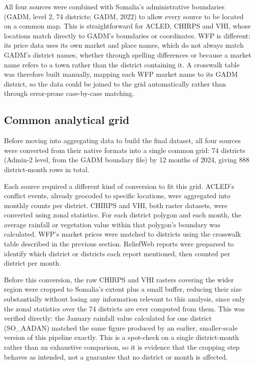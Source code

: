 \documentclass[12pt,a4paper]{article}
\begin{document}
All four sources were combined with Somalia's administrative boundaries (GADM, level 2, 74 districts; GADM, 2022) to allow every source to be located on a common map. This is straightforward for ACLED, CHIRPS and VHI, whose locations match directly to GADM's boundaries or coordinates. WFP is different: its price data uses its own market and place names, which do not always match GADM's district names, whether through spelling differences or because a market name refers to a town rather than the district containing it. A crosswalk table was therefore built manually, mapping each WFP market name to its GADM district, so the data could be joined to the grid automatically rather than through error-prone case-by-case matching.

\subsection{Common analytical grid}

Before moving into aggregating data to build the final dataset, all four sources were converted from their native formats into a single common grid: 74 districts (Admin-2 level, from the GADM boundary file) by 12 months of 2024, giving 888 district-month rows in total.

Each source required a different kind of conversion to fit this grid. ACLED's conflict events, already geocoded to specific locations, were aggregated into monthly counts per district. CHIRPS and VHI, both raster datasets, were converted using zonal statistics. For each district polygon and each month, the average rainfall or vegetation value within that polygon's boundary was calculated. WFP's market prices were matched to districts using the crosswalk table described in the previous section. ReliefWeb reports were geoparsed to identify which district or districts each report mentioned, then counted per district per month.

Before this conversion, the raw CHIRPS and VHI rasters covering the wider region were cropped to Somalia's extent plus a small buffer, reducing their size substantially without losing any information relevant to this analysis, since only the zonal statistics over the 74 districts are ever computed from them. This was verified directly: the January rainfall value calculated for one district (SO\_AADAN) matched the same figure produced by an earlier, smaller-scale version of this pipeline exactly. This is a spot-check on a single district-month rather than an exhaustive comparison, so it is evidence that the cropping step behaves as intended, not a guarantee that no district or month is affected.
\end{document}
